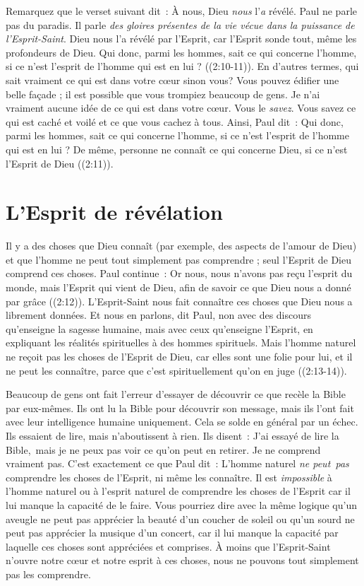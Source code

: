 Remarquez que le verset suivant dit~:
 \og À nous, Dieu \emph{nous} l'\emph{a} révélé. \fg{}
 Paul ne parle pas du paradis.
 Il parle \emph{des gloires présentes de la vie vécue dans la puissance
 de l'Esprit-Saint}.
 \og Dieu nous l'a révélé par l'Esprit, car l'Esprit sonde tout,
 même les profondeurs de Dieu. Qui donc, parmi les hommes,
 sait ce qui concerne l'homme, si ce n'est l'esprit de l'homme
 qui est en lui ? \fg{} ((2:10-11)).
 En d'autres termes, qui sait vraiment ce qui est dans votre cœur sinon vous?
 Vous pouvez édifier une belle façade ; il est possible que vous trompiez
 beaucoup de gens.
 Je n'ai vraiment aucune idée de ce qui est dans votre cœur.
 Vous le \emph{savez}.
 Vous savez ce qui est caché et voilé et ce que vous cachez à tous.
 Ainsi, Paul dit~:
 \og Qui donc, parmi les hommes, sait ce qui concerne l'homme,
 si ce n'est l'esprit de l'homme qui est en lui ?
 De même, personne ne connaît ce qui concerne Dieu,
 si ce n'est l'Esprit de Dieu \fg{} ((2:11)).


\section{L'Esprit de r\'ev\'elation}

Il y a des choses que Dieu connaît
 (par exemple, des aspects de l'amour de Dieu)
 et que l'homme ne peut tout simplement pas comprendre ;
 seul l'Esprit de Dieu comprend ces choses. Paul continue~:
 \og Or nous, nous n'avons pas reçu l'esprit du monde,
 mais l'Esprit qui vient de Dieu, afin de savoir ce que Dieu
 nous a donné par grâce \fg{} ((2:12)).
 L'Esprit-Saint nous fait connaître ces choses que Dieu
 nous a librement données.
 \og Et nous en parlons, dit Paul, non avec des discours qu'enseigne
 la sagesse humaine, mais avec ceux qu'enseigne l'Esprit,
 en expliquant les réalités spirituelles à des hommes spirituels.
 Mais l'homme naturel ne reçoit pas les choses de l'Esprit de Dieu,
 car elles sont une folie pour lui, et il ne peut les connaître,
 parce que c'est spirituellement qu'on en juge \fg{}
 ((2:13-14)).

Beaucoup de gens ont fait l'erreur d'essayer de découvrir ce que recèle
 la Bible par eux-mêmes. Ils ont lu la Bible pour découvrir son message,
 mais ils l'ont fait avec leur intelligence humaine uniquement.
 Cela se solde en général par un échec. Ils essaient de lire,
 mais n'aboutissent à rien. Ils disent~:
 \og J'ai essayé de lire la Bible,~mais je ne peux pas voir ce qu'on peut
 en retirer. Je ne comprend vraiment pas. \fg{}
 C'est exactement ce que Paul dit~:
 \og L'homme naturel \emph{ne peut~pas} comprendre les choses de l'Esprit,
 ni même les connaître. \fg{}
 Il est \emph{impossible} à l'homme naturel ou à l'esprit naturel
 de comprendre les choses de l'Esprit car il lui manque la capacité
 de le faire. Vous pourriez dire avec la même logique qu'un aveugle
 ne peut pas apprécier la beauté d'un coucher de soleil ou qu'un sourd
 ne peut pas apprécier la musique d'un concert, car il lui manque la capacité
 par laquelle ces choses sont appréciées et comprises.
 À moins que l'Esprit-Saint n'ouvre notre cœur et notre esprit à ces choses,
 nous ne pouvons tout simplement pas les comprendre.


